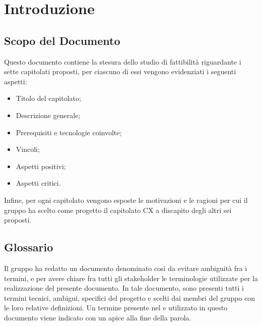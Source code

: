 \section{Introduzione}
\subsection{Scopo del Documento}
Questo documento contiene la stesura dello studio di fattibilità riguardante i sette capitolati proposti, per ciascuno di essi vengono evidenziati i seguenti aspetti:
\begin{itemize}
    \item Titolo del capitolato;
    \item Descrizione generale;
    \item Prerequisiti e tecnologie coinvolte;
    \item Vincoli;
    \item Aspetti positivi;
    \item Aspetti critici.
\end{itemize}
Infine, per ogni capitolato vengono esposte le motivazioni e le ragioni per cui il gruppo ha scelto come progetto il capitolato CX \NomeProgetto{} a discapito degli altri sei proposti.

\subsection{Glossario}
Il gruppo \Gruppo{} ha redatto un documento denominato  così da evitare ambiguità fra i termini, e per avere chiare fra tutti gli stakeholder le terminologie utilizzate per la realizzazione del presente documento.
In tale documento, sono presenti tutti i termini tecnici, ambigui, specifici del progetto e scelti dai membri del gruppo con le loro relative definizioni.
Un termine presente nel  e utilizzato in questo documento viene indicato con un apice  alla fine della parola.

